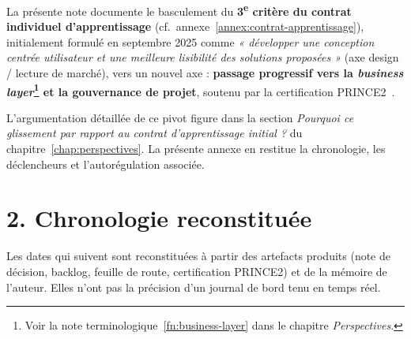 La présente note documente le basculement du \textbf{3\textsuperscript{e} critère du contrat individuel d'apprentissage} (cf.~annexe~\ref{annex:contrat-apprentissage}), initialement formulé en septembre 2025 comme \emph{« développer une conception centrée utilisateur et une meilleure lisibilité des solutions proposées »} (axe design / lecture de marché), vers un nouvel axe : \textbf{passage progressif vers la \textit{business layer}\footnote{Voir la note terminologique~\ref{fn:business-layer} dans le chapitre \textit{Perspectives}.} et la gouvernance de projet}, soutenu par la certification PRINCE2~\citep{prince2_2017}.

L'argumentation détaillée de ce pivot figure dans la section \emph{Pourquoi ce glissement par rapport au contrat d'apprentissage initial ?} du chapitre~\ref{chap:perspectives}. La présente annexe en restitue la chronologie, les déclencheurs et l'autorégulation associée.

\section*{2. Chronologie reconstituée}

\begin{tcolorbox}[colback=gray!5, colframe=gray!50, boxrule=0.4pt, arc=3pt,
  left=8pt, right=8pt, top=6pt, bottom=6pt]
\small
Les dates qui suivent sont reconstituées à partir des artefacts produits (note de décision, backlog, feuille de route, certification PRINCE2) et de la mémoire de l'auteur. Elles n'ont pas la précision d'un journal de bord tenu en temps réel.
\end{tcolorbox}

\smallskip

